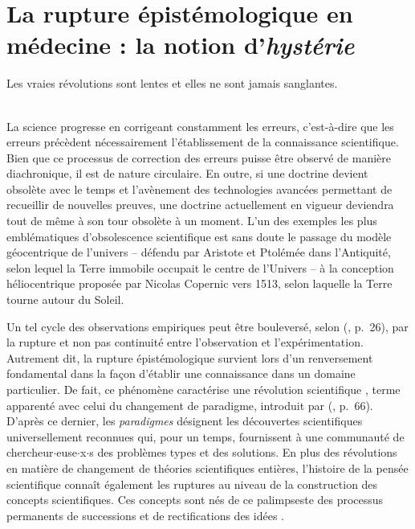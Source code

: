 \section{La rupture épistémologique en médecine : la notion d'\textit{hystérie}}
\begin{myepigraph}
\small
\og{}Les vraies révolutions sont lentes et elles ne sont jamais sanglantes.\fg{}\\[-1ex]
\\ 
\end{myepigraph}
\medskip
La science progresse en corrigeant constamment les erreurs, c'est-à-dire que les erreurs précèdent nécessairement l'établissement de la connaissance scientifique. Bien que ce processus de correction des erreurs puisse être observé de manière diachronique, il est de nature circulaire. En outre, si une doctrine devient obsolète avec le temps et l'avènement des technologies avancées permettant de recueillir de nouvelles preuves, une doctrine actuellement en vigueur deviendra tout de même à son tour obsolète à un moment. L'un des exemples les plus emblématiques d'obsolescence scientifique est sans doute le passage du modèle géocentrique de l'univers -- défendu par Aristote et Ptolémée dans l'Antiquité, selon lequel la Terre immobile occupait le centre de l'Univers -- à la conception héliocentrique proposée par Nicolas Copernic vers 1513, selon laquelle la Terre tourne autour du Soleil. 



Un tel cycle des observations empiriques peut être bouleversé, selon \citeauthor{bachelard1934formation} (\citeyear{bachelard1934formation}, p.~26), par la \og{}rupture et non pas continuité entre l'observation et l'expérimentation\fg{}. Autrement dit, la rupture épistémologique survient lors d'un renversement fondamental dans la façon d'établir une connaissance dans un domaine particulier. De fait, ce phénomène caractérise une \og{}révolution scientifique\fg{} \citep[p.~2]{koyre1957closed}, terme apparenté avec celui du \og{}changement de paradigme\fg{}, introduit par \citeauthor{kuhn1962structure} (\citeyear{kuhn1962structure}, p.~66). D'après ce dernier, les \textit{paradigmes} désignent les \og{}découvertes scientifiques universellement reconnues qui, pour un temps, fournissent à une communauté de chercheur$\cdot$euse$\cdot$x$\cdot$s des problèmes types et des solutions\fg{}. En plus des révolutions en matière de changement de théories scientifiques entières, l'histoire de la pensée scientifique connaît également les ruptures au niveau de la construction des concepts scientifiques. Ces concepts sont nés de ce palimpseste des processus permanents de successions et de rectifications des idées \citep[p.~24]{astolfi2008chapitre}. 

